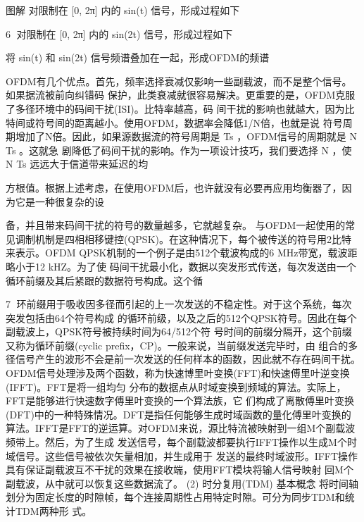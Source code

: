 图解
对限制在 [0, 2π] 内的 sin(t) 信号，形成过程如下




                                                                         6
对限制在 [0, 2π] 内的 sin(2t) 信号，形成过程如下




将 sin(t) 和 sin(2t) 信号频谱叠加在一起，形成OFDM的频谱




OFDM有几个优点。首先，频率选择衰减仅影响一些副载波，而不是整个信号。如果据流被前向纠错码
保护，此类衰减就很容易解决。更重要的是，OFDM克服了多径环境中的码间干扰(ISI)。比特率越高，码
间干扰的影响也就越大，因为比特间或符号间的距离越小。使用OFDM，数据率会降低1/N倍，也就是说
符号周期增加了N倍。因此，如果源数据流的符号周期是 Ts ，OFDM信号的周期就是 N Ts 。这就急
剧降低了码间干扰的影响。作为一项设计技巧，我们要选择 N ，使 N Ts 远远大于信道带来延迟的均
                                    ​           ​




方根值。根据上述考虑，在使用OFDM后，也许就没有必要再应用均衡器了，因为它是一种很复杂的设
                                         ​




备，并且带来码间干扰的符号的数量越多，它就越复杂。
与OFDM一起使用的常见调制机制是四相相移键控(QPSK)。在这种情况下，每个被传送的符号用2比特
来表示。OFDM QPSK机制的一个例子是由512个载波构成的6 MHz带宽，载波距略小于12 kHZ。为了使
码间干扰最小化，数据以突发形式传送，每次发送由一个循环前缀及其后紧跟的数据符号构成。这个循

                                                      7
环前缀用于吸收因多径而引起的上一次发送的不稳定性。对于这个系统，每次突发包括由64个符号构成
的循环前级，以及之后的512个QPSK符号。因此在每个副载波上，QPSK符号被持续时间为64/512个符
号时间的前缀分隔开，这个前缀又称为循环前缀(cyclic prefix，CP)。一般来说，当前缀发送完毕时，由
组合的多径信号产生的波形不会是前一次发送的任何样本的函数，因此就不存在码间干扰。
OFDM信号处理涉及两个函数，称为快速博里叶变换(FFT)和快速傅里叶逆变换(IFFT)。FFT是将一组均匀
分布的数据点从时域变换到频域的算法。实际上，FFT是能够进行快速数字傅里叶变换的一个算法族，它
们构成了离散傅里叶变换(DFT)中的一种特殊情况。DFT是指任何能够生成时域函数的量化傅里叶变换的
算法。IFFT是FFT的逆运算。对OFDM来说，源比特流被映射到一组M个副载波频带上。然后，为了生成
发送信号，每个副载波都要执行IFFT操作以生成M个时域信号。这些信号被依次矢量相加，并生成用于
发送的最终时域波形。IFFT操作具有保证副载波互不干扰的效果在接收端，使用FFT模块将输人信号映射
回M个副载波，从中就可以恢复这些数据流了。
(2) 时分复用(TDM)
基本概念
将时间轴划分为固定长度的时隙帧，每个连接周期性占用特定时隙。可分为同步TDM和统计TDM两种形
式。





